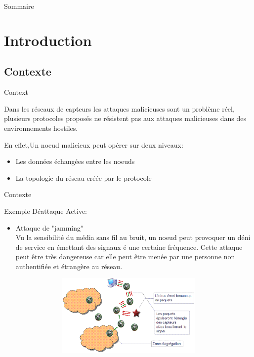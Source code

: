 \documentclass[12pt, c]{beamer}
\begin{document}
\begin{frame}{\scriptsize Sommaire}
\transwipe
\scriptsize
  \tableofcontents
\end{frame}

\section{Introduction}
	\subsection{Contexte}
	\begin{frame}{Context}
	\transwipe
	
	\vspace{-0.25cm}
	\begin{block}
		\scriptsize Dans les réseaux de capteurs les attaques malicieuses sont un problème réel, plusieurs protocoles proposés ne résistent pas aux attaques malicieuses dans des environnements hostiles.
		
	 En effet,Un noeud malicieux peut opérer sur deux niveaux:
							\begin{itemize}
								\item Les données échangées entre les noeuds
								\item La topologie du réseau créée par le protocole
							\end{itemize}

	\end{block}
	\end{frame}
	
	\begin{frame}{Contexte}
		\transwipe
		\vspace{-0.25cm}
		\begin{block}{Exemple Déattaque Active:}
			\begin{itemize}
				\item Attaque de "jamming" \\ Vu la sensibilité du média sans fil au bruit, un noeud peut provoquer un déni de service en émettant des signaux é une certaine fréquence. Cette attaque peut être très dangereuse car elle peut être menée par une personne non authentifiée et étrangère au réseau.
				\begin{figure}
		\begin{center}
		\includegraphics[width=10cm,height=4cm]{images/jamming.PNG}
		\end{center}
	\end{figure}
			\end{itemize}
		\end{block}
	\end{frame}
	
\end{document}
